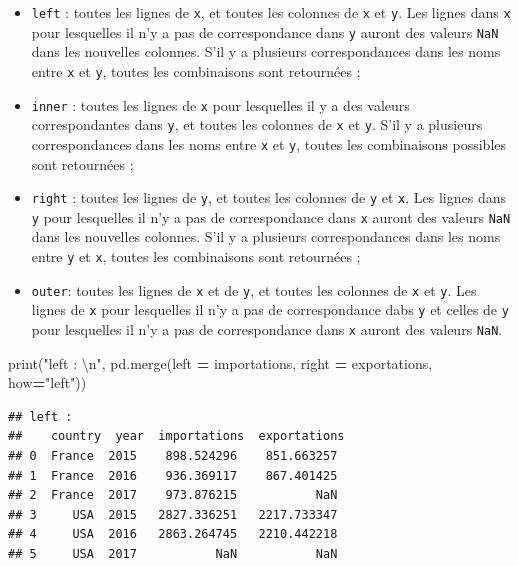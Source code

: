 \documentclass[12pt,]{book}
\newenvironment{Shaded}{\begin{snugshade}}{\end{snugshade}}
\newcommand{\CharTok}[1]{\textcolor[rgb]{0.31,0.60,0.02}{#1}}
\newcommand{\StringTok}[1]{\textcolor[rgb]{0.31,0.60,0.02}{#1}}
\newcommand{\OperatorTok}[1]{\textcolor[rgb]{0.81,0.36,0.00}{\textbf{#1}}}
\newcommand{\BuiltInTok}[1]{#1}
\newcommand{\NormalTok}[1]{#1}
\providecommand{\tightlist}{%
  \setlength{\itemsep}{0pt}\setlength{\parskip}{0pt}}
\numberwithin{equation}{section}
\numberwithin{countremarque}{section}
\begin{document}
\begin{itemize}
\tightlist
\item
  \texttt{left} : toutes les lignes de \texttt{x}, et toutes les
  colonnes de \texttt{x} et \texttt{y}. Les lignes dans \texttt{x} pour
  lesquelles il n'y a pas de correspondance dans \texttt{y} auront des
  valeurs \texttt{NaN} dans les nouvelles colonnes. S'il y a plusieurs
  correspondances dans les noms entre \texttt{x} et \texttt{y}, toutes
  les combinaisons sont retournées ;
\item
  \texttt{inner} : toutes les lignes de \texttt{x} pour lesquelles il y
  a des valeurs correspondantes dans \texttt{y}, et toutes les colonnes
  de \texttt{x} et \texttt{y}. S'il y a plusieurs correspondances dans
  les noms entre \texttt{x} et \texttt{y}, toutes les combinaisons
  possibles sont retournées ;
\item
  \texttt{right} : toutes les lignes de \texttt{y}, et toutes les
  colonnes de \texttt{y} et \texttt{x}. Les lignes dans \texttt{y} pour
  lesquelles il n'y a pas de correspondance dans \texttt{x} auront des
  valeurs \texttt{NaN} dans les nouvelles colonnes. S'il y a plusieurs
  correspondances dans les noms entre \texttt{y} et \texttt{x}, toutes
  les combinaisons sont retournées ;
\item
  \texttt{outer}: toutes les lignes de \texttt{x} et de \texttt{y}, et
  toutes les colonnes de \texttt{x} et \texttt{y}. Les lignes de
  \texttt{x} pour lesquelles il n'y a pas de correspondance dabs
  \texttt{y} et celles de \texttt{y} pour lesquelles il n'y a pas de
  correspondance dans \texttt{x} auront des valeurs \texttt{NaN}.
\end{itemize}

\begin{Shaded}
\begin{Highlighting}[]
\BuiltInTok{print}\NormalTok{(}\StringTok{"left : }\CharTok{\textbackslash{}n}\StringTok{"}\NormalTok{, pd.merge(left }\OperatorTok{=}\NormalTok{ importations, right }\OperatorTok{=}\NormalTok{ exportations, how}\OperatorTok{=}\StringTok{"left"}\NormalTok{))}
\end{Highlighting}
\end{Shaded}

\begin{lstlisting}
## left : 
##    country  year  importations  exportations
## 0  France  2015    898.524296    851.663257
## 1  France  2016    936.369117    867.401425
## 2  France  2017    973.876215           NaN
## 3     USA  2015   2827.336251   2217.733347
## 4     USA  2016   2863.264745   2210.442218
## 5     USA  2017           NaN           NaN
\end{lstlisting}
\end{document}
